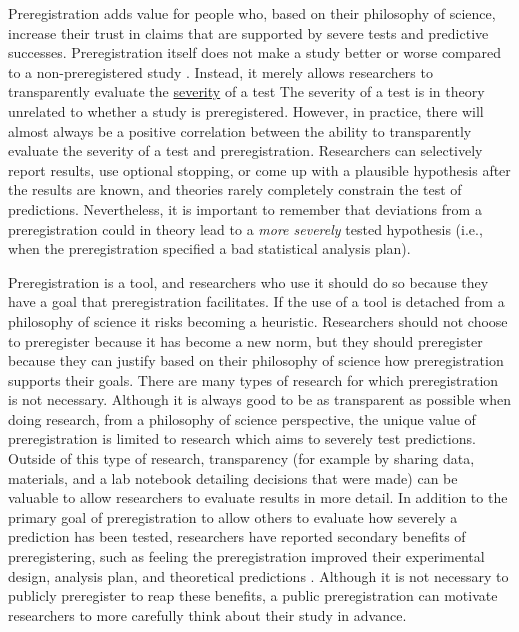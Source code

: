 \documentclass[
  oneside]{krantz}
\begin{document}
Preregistration adds value for people who, based on their philosophy of science, increase their trust in claims that are supported by severe tests and predictive successes. Preregistration itself does not make a study better or worse compared to a non-preregistered study \citep{lakens_value_2019}. Instead, it merely allows researchers to transparently evaluate the \protect\hyperlink{severity}{severity} of a test The severity of a test is in theory unrelated to whether a study is preregistered. However, in practice, there will almost always be a positive correlation between the ability to transparently evaluate the severity of a test and preregistration. Researchers can selectively report results, use optional stopping, or come up with a plausible hypothesis after the results are known, and theories rarely completely constrain the test of predictions. Nevertheless, it is important to remember that deviations from a preregistration could in theory lead to a \emph{more severely} tested hypothesis (i.e., when the preregistration specified a bad statistical analysis plan).

Preregistration is a tool, and researchers who use it should do so because they have a goal that preregistration facilitates. If the use of a tool is detached from a philosophy of science it risks becoming a heuristic. Researchers should not choose to preregister because it has become a new norm, but they should preregister because they can justify based on their philosophy of science how preregistration supports their goals. There are many types of research for which preregistration is not necessary. Although it is always good to be as transparent as possible when doing research, from a philosophy of science perspective, the unique value of preregistration is limited to research which aims to severely test predictions. Outside of this type of research, transparency (for example by sharing data, materials, and a lab notebook detailing decisions that were made) can be valuable to allow researchers to evaluate results in more detail. In addition to the primary goal of preregistration to allow others to evaluate how severely a prediction has been tested, researchers have reported secondary benefits of preregistering, such as feeling the preregistration improved their experimental design, analysis plan, and theoretical predictions \citep{sarafoglou_survey_2022}. Although it is not necessary to publicly preregister to reap these benefits, a public preregistration can motivate researchers to more carefully think about their study in advance.
\end{document}
